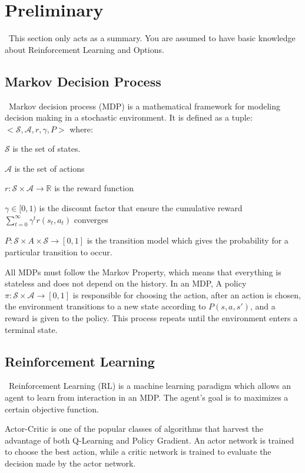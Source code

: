 \documentclass{article}
\begin{document}
	\section{Preliminary}
	\qquad \ This section only acts as a summary. You are assumed to have basic knowledge about Reinforcement Learning and Options.
	\subsection*{Markov Decision Process}
	\qquad \ Markov decision process (MDP) \cite{sutton2018reinforcement} is a mathematical framework for modeling decision making in a stochastic environment. It is defined as a tuple: $<\mathcal{S}, \mathcal{A}, r, \gamma, P>$ where:
	
	$\mathcal{S}$ is the set of states.
	
	$\mathcal{A}$ is the set of actions
	
	$r : \mathcal{S} \times \mathcal{A} \rightarrow \mathbb{R}$ is the reward function
	
	$\gamma \in [0,1)$ is the discount factor that ensure the cumulative reward $\sum_{t=0}^{\infty} \gamma^t r(s_t, a_t)$ converges
	
	$P : \mathcal{S} \times A \times \mathcal{S} \rightarrow [0,1]$ is the transition model which gives the probability for a particular transition to occur.
	
	\quad All MDPs must follow the Markov Property, which means that everything is stateless and does not depend on the history. In an MDP, A policy $\pi : \mathcal{S} \times \mathcal{A} \rightarrow [0,1]$ is responsible for choosing the action, after an action is chosen, the environment transitions to a new state according to $P(s,a,s')$, and a reward is given to the policy. This process repeats until the environment enters a terminal state.
	\subsection*{Reinforcement Learning}
	\qquad \ Reinforcement Learning (RL) \cite{sutton2018reinforcement} is a machine learning paradigm which allows an agent to learn from interaction in an MDP. The agent's goal is to maximizes a certain objective function.
	
	\quad Actor-Critic \cite{Konda00actor-criticalgorithms} is one of the popular classes of algorithms that harvest the advantage of both Q-Learning and Policy Gradient. An actor network is trained to choose the best action, while a critic network is trained to evaluate the decision made by the actor network.
\end{document}

